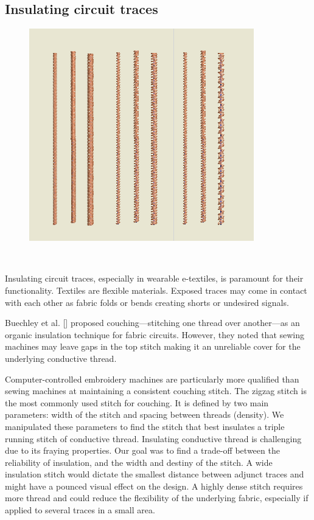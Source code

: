 \documentclass[header.tex]{subfiles}
\begin{document}
\subsection{Insulating circuit traces}
\begin{figure}
\centering
  \includegraphics[width=0.7\columnwidth]{figures/Insulation}
  \caption{}~\label{fig:Insulation}
  \vspace{-2.5em}
\end{figure}
Insulating circuit traces, especially in wearable e-textiles, is paramount for their functionality. Textiles are flexible materials. Exposed traces may come in contact with each other as fabric folds or bends creating shorts or undesired signals.



Buechley et al. [] proposed couching---stitching one thread over another---as an organic insulation technique for fabric circuits. However, they noted that sewing machines may leave gaps in the top stitch making it an unreliable cover for the underlying conductive thread.

Computer-controlled embroidery machines are particularly more qualified than sewing machines at maintaining a consistent couching stitch. The zigzag stitch is the most commonly used stitch for couching. It is defined by two main parameters: width of the stitch and spacing between threads (density). We manipulated these parameters to find the stitch that best insulates a triple running stitch of conductive thread. Insulating conductive thread is challenging due to its fraying properties. Our goal was to find a trade-off between the reliability of insulation, and the width and destiny of the stitch. A wide insulation stitch would dictate the smallest distance between adjunct traces and might have a pounced visual effect on the design. A highly dense stitch requires more thread and could reduce the flexibility of the underlying fabric, especially if applied to several traces in a small area.
\end{document}
